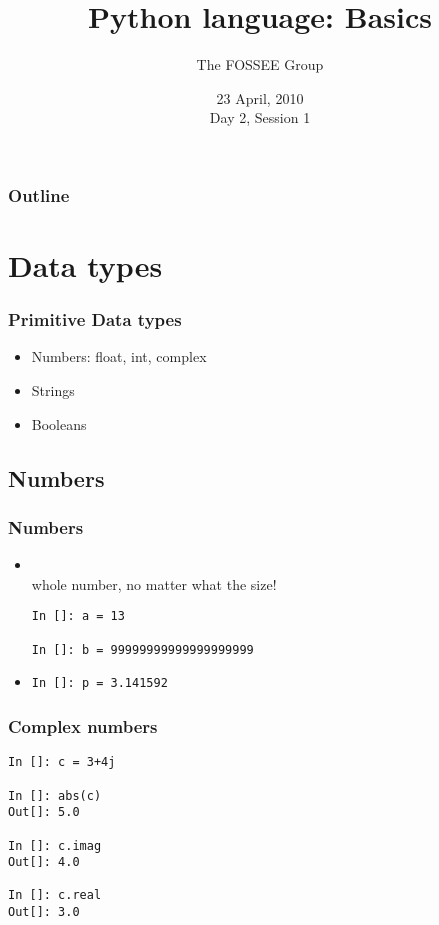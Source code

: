\documentclass[14pt,compress]{beamer}
\title[Basic Python]{Python language: Basics}
\author[FOSSEE Team] {The FOSSEE Group}
\institute[IIT Bombay] {Department of Aerospace Engineering\\IIT Bombay}
\date[] {23 April, 2010\\Day 2, Session 1}
\newcommand{\kwrd}[1]{ \texttt{\textbf{\color{blue}{#1}}}  }
\begin{document}
\begin{frame}
  \titlepage
\end{frame}

\begin{frame}
  \frametitle{Outline}
  \tableofcontents
\end{frame}

\section{Data types}

\begin{frame}
  \frametitle{Primitive Data types}
  \begin{itemize}
    \item Numbers: float, int, complex
    \item Strings
    \item Booleans
  \end{itemize}
\end{frame}

\subsection{Numbers}
\begin{frame}[fragile]
  \frametitle{Numbers}
  \begin{itemize}
    \item \kwrd{int}\\ whole number, no matter what the size!
  \begin{lstlisting}
In []: a = 13

In []: b = 99999999999999999999
  \end{lstlisting}
    \item \kwrd{float}
  \begin{lstlisting}
In []: p = 3.141592
  \end{lstlisting}
  \end{itemize}
\end{frame}

\begin{frame}[fragile]
\frametitle{Complex numbers}
  \begin{lstlisting}
In []: c = 3+4j

In []: abs(c)
Out[]: 5.0

In []: c.imag
Out[]: 4.0

In []: c.real
Out[]: 3.0
  \end{lstlisting}
\end{frame}
\end{document}
